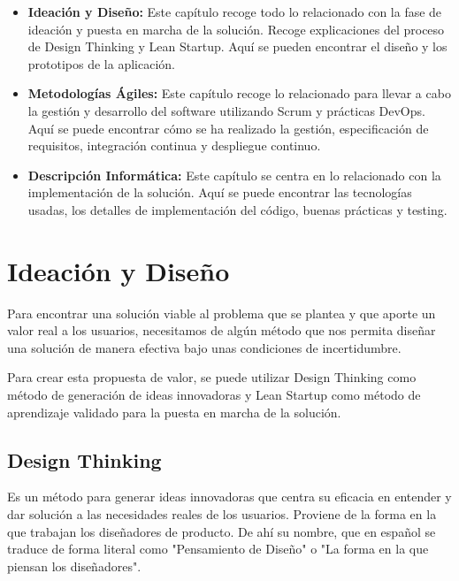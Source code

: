 \documentclass[12pt,twoside,titlepage]{report}
\newcommand\blankpage{%
    \newpage
    \null
    \thispagestyle{empty}%
    \newpage}
\begin{document}
\begin{itemize}
    \item \textbf{Ideación y Diseño:} Este capítulo recoge todo lo relacionado con la fase de ideación y puesta en marcha de la solución. Recoge explicaciones del proceso de Design Thinking y Lean Startup. Aquí se pueden encontrar el diseño y los prototipos de la aplicación.
    \item \textbf{Metodologías Ágiles:} Este capítulo recoge lo relacionado para llevar a cabo la gestión y desarrollo del software utilizando Scrum y prácticas DevOps. Aquí se puede encontrar cómo se ha realizado la gestión, especificación de requisitos, integración continua y despliegue continuo.
    \item \textbf{Descripción Informática:} Este capítulo se centra en lo relacionado con la implementación de la solución. Aquí se puede encontrar las tecnologías usadas, los detalles de implementación del código, buenas prácticas y testing.
\end{itemize}





\chapter{Ideación y Diseño}

Para encontrar una solución viable al problema que se plantea y que aporte un valor real a los usuarios, necesitamos de algún método que nos permita diseñar una solución de manera efectiva bajo unas condiciones de incertidumbre.

Para crear esta propuesta de valor, se puede utilizar Design Thinking como método de generación de ideas innovadoras y Lean Startup como método de aprendizaje validado para la puesta en marcha de la solución.

\section{Design Thinking}

Es un método para generar ideas innovadoras que centra su eficacia en entender y dar solución a las necesidades reales de los usuarios. Proviene de la forma en la que trabajan los diseñadores de producto. De ahí su nombre, que en español se traduce de forma literal como "Pensamiento de Diseño" o "La forma en la que piensan los diseñadores".
\end{document}
